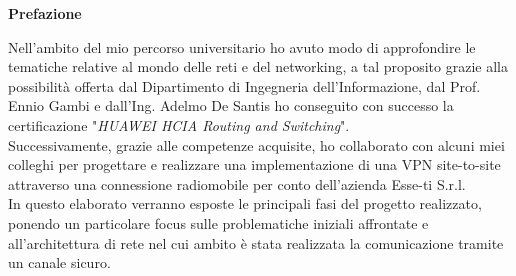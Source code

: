 \clearpage
\phantom{a}
\vfill

\begin{center}
    \textbf{Prefazione}
\end{center}

\begin{flushleft}

    Nell'ambito del mio percorso universitario ho avuto modo di approfondire le tematiche relative al mondo delle reti e del networking, a tal proposito grazie alla possibilità offerta dal Dipartimento di Ingegneria dell'Informazione, dal Prof. Ennio Gambi e dall'Ing. Adelmo De Santis ho conseguito con successo la certificazione "\textit{HUAWEI HCIA Routing and Switching}".\\
    Successivamente, grazie alle competenze acquisite, ho collaborato con alcuni miei colleghi
    per progettare e realizzare una implementazione di una VPN site-to-site attraverso una connessione radiomobile per conto dell'azienda Esse-ti S.r.l.\\
    In questo elaborato verranno esposte le principali fasi del
    progetto realizzato, ponendo un particolare focus sulle problematiche iniziali affrontate e all'architettura di rete nel cui ambito è stata realizzata la comunicazione tramite un canale sicuro.

\end{flushleft}

\vfill
\newpage